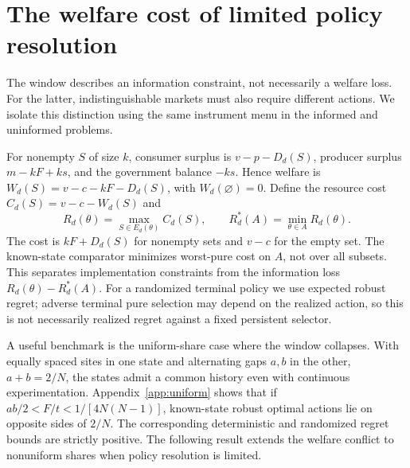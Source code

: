 \documentclass[11pt]{article}
\begin{document}
\section{The welfare cost of limited policy resolution}
\label{sec:welfare}
The window describes an information constraint, not necessarily a welfare loss. For the latter, indistinguishable markets must also require different actions. We isolate this distinction using the same instrument menu in the informed and uninformed problems.

For nonempty $S$ of size $k$, consumer surplus is $v-p-D_d(S)$, producer surplus $m-kF+ks$, and the government balance $-ks$. Hence welfare is $W_d(S)=v-c-kF-D_d(S)$, with $W_d(\varnothing)=0$. Define the resource cost $C_d(S)=v-c-W_d(S)$ and
\begin{equation}\label{eq:robust}
R_d(\theta)=\max_{S\in E_d(\theta)}C_d(S),\qquad R_d^*(A)=\min_{\theta\in A}R_d(\theta).
\end{equation}
The cost is $kF+D_d(S)$ for nonempty sets and $v-c$ for the empty set. The known-state comparator minimizes worst-pure cost on $A$, not over all subsets. This separates implementation constraints from the information loss $R_d(\theta)-R_d^*(A)$. For a randomized terminal policy we use expected robust regret; adverse terminal pure selection may depend on the realized action, so this is not necessarily realized regret against a fixed persistent selector.

A useful benchmark is the uniform-share case where the window collapses. With equally spaced sites in one state and alternating gaps $a,b$ in the other, $a+b=2/N$, the states admit a common history even with continuous experimentation. Appendix~\ref{app:uniform} shows that if $ab/2<F/t<1/[4N(N-1)]$, known-state robust optimal actions lie on opposite sides of $2/N$. The corresponding deterministic and randomized regret bounds are strictly positive. The following result extends the welfare conflict to nonuniform shares when policy resolution is limited.
\end{document}

